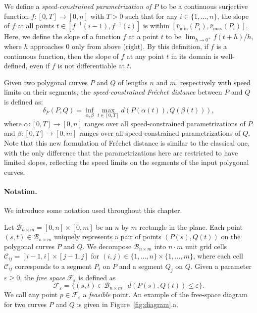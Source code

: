 \documentclass[12pt]{dalthesis}
\newcommand{\lee}{\leqslant}
\newcommand{\gee}{\geqslant}
\newcommand{\set}[1]{{\{ #1 \}}}
\newcommand{\eps}{\varepsilon}
\newcommand{\CF}{{\mathscr F}}
\newcommand{\CB}{{\mathscr B}}
\newcommand{\CC}{{\mathscr C}}
\newcommand{\Frechet}{Fr\'echet }
\newcommand{\distFS}{\delta_{\bar{F}}} \newcommand{\distWeakF}{\delta_{\bar{N}}} \newcommand{\distClosedF}{\delta_{\bar{C}}} \newcommand{\distPartialF}{\delta_{\bar{P}}} \newcommand{\distGrpahF}{\delta_{\bar{G}}} \newcommand{\distDisF}{\delta_{dF}} \newcommand{\distGeoF}{\delta_{\hat{F}}} \newcommand{\distHomF}{\delta_{h}} \newcommand{\distC}{\delta_C} \newcommand{\distSetF}{\delta_{\CF}}
\newcommand{\cell}[1]{{\CC_{#1}}}
\newcommand{\BNM}{\CB_{n \times m}}
\newcommand{\Feps}{\CF_\eps}
\newcommand{\Xmin}[2]{{#1}_{\min}(#2)}
\newcommand{\Xmax}[2]{{#1}_{\max}(#2)}
\newcommand{\umin}[1]{\Xmin{\bar{v}}{#1}}
\newcommand{\umax}[1]{\Xmax{\bar{v}}{#1}}
\begin{document}
We define a {\em speed-constrained parametrization of $P$\/}
to be a continuous surjective function $f: [0,T] \rightarrow [0,n]$ with $T > 0$
such that for any $i \in \set{1, \ldots, n}$,
the slope
of $f$ at all points $t \in [f^{-1}(i-1),f^{-1}(i)]$ is within $[\umin{P_i}, \umax{P_i}]$. 
Here, we define the slope of a function $f$ at a point $t$ to be 
$\lim_{h \rightarrow 0^+} f(t+h)/h$, where $h$ approaches 0 only from above (right).
By this definition, if $f$ is a continuous function, 
then the slope of $f$ at any point $t$ in its domain is well-defined,
even if $f$ is not differentiable at $t$. 

Given two polygonal curves $P$ and $Q$ of lengths $n$ and $m$, respectively 
with speed limits on their segments, 
the {\em speed-constrained \Frechet distance\/} between $P$ and $Q$ 
is defined as:
\[
	\distFS(P,Q) = \inf_{\alpha, \beta} \max_{t \in [0,T]} d( P(\alpha(t)), Q(\beta(t)) ),
\]
where $\alpha: [0,T] \rightarrow [0,n]$ ranges over all speed-constrained parametrizations of $P$ 
and $\beta:[0,T] \rightarrow [0,m]$ ranges over all speed-constrained parametrizations of $Q$.
Note that this new formulation of \Frechet distance is similar to the classical one,
with the only difference that the parametrizations here are restricted to have
limited slopes, reflecting the speed limits on the segments of the input polygonal curves.






\paragraph{Notation.}
We introduce some notation used throughout this chapter.

Let $\BNM = [0,n] \times [0,m]$ be an $n$ by $m$ rectangle  in the plane.
Each point $(s,t) \in \BNM$ uniquely represents a pair of points
$(P(s),Q(t))$ on the polygonal curves $P$ and $Q$.
We decompose $\BNM$ into
$n\cdot m$ unit grid cells $\cell{ij} = [i-1,i] \times [j-1,j]$
for $(i,j) \in \set{1, \ldots, n} \times \set{1, \ldots, m}$,
where each cell $\cell{ij}$ corresponds to
a segment $P_i$ on $P$ and a segment $Q_j$ on $Q$.
Given a parameter $\eps \gee 0$,
the {\em free space\/} $\Feps$ is defined as
\[
	\Feps = \set{(s,t) \in \BNM \ | \ d(P(s),Q(t)) \lee \eps }.
\]
We call any point $p \in \Feps$ a {\em feasible\/} point.
An example of the free-space diagram for two curves $P$ and $Q$ 
is given in Figure~\ref{fig:diagram}.a.
\end{document}
